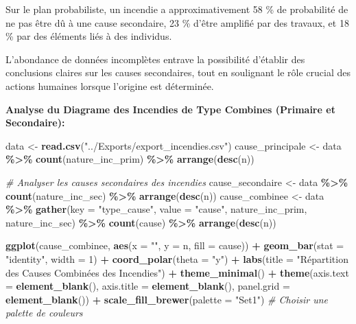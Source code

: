 \documentclass[
]{article}
\newenvironment{Shaded}{\begin{snugshade}}{\end{snugshade}}
\newcommand{\AttributeTok}[1]{\textcolor[rgb]{0.13,0.29,0.53}{#1}}
\newcommand{\CommentTok}[1]{\textcolor[rgb]{0.56,0.35,0.01}{\textit{#1}}}
\newcommand{\DecValTok}[1]{\textcolor[rgb]{0.00,0.00,0.81}{#1}}
\newcommand{\FunctionTok}[1]{\textcolor[rgb]{0.13,0.29,0.53}{\textbf{#1}}}
\newcommand{\NormalTok}[1]{#1}
\newcommand{\OtherTok}[1]{\textcolor[rgb]{0.56,0.35,0.01}{#1}}
\newcommand{\SpecialCharTok}[1]{\textcolor[rgb]{0.81,0.36,0.00}{\textbf{#1}}}
\newcommand{\StringTok}[1]{\textcolor[rgb]{0.31,0.60,0.02}{#1}}
\begin{document}
Sur le plan probabiliste, un incendie a approximativement 58 \% de
probabilité de ne pas être dû à une cause secondaire, 23 \% d'être
amplifié par des travaux, et 18 \% par des éléments liés à des
individus.

L'abondance de données incomplètes entrave la possibilité d'établir des
conclusions claires sur les causes secondaires, tout en soulignant le
rôle crucial des actions humaines lorsque l'origine est déterminée.

\textbf{Analyse du Diagrame des Incendies de Type Combines (Primaire et
Secondaire):}

\begin{Shaded}
\begin{Highlighting}[]
\NormalTok{data }\OtherTok{\textless{}{-}} \FunctionTok{read.csv}\NormalTok{(}\StringTok{"../Exports/export\_incendies.csv"}\NormalTok{)}
\NormalTok{cause\_principale }\OtherTok{\textless{}{-}}\NormalTok{ data }\SpecialCharTok{\%\textgreater{}\%}
  \FunctionTok{count}\NormalTok{(nature\_inc\_prim) }\SpecialCharTok{\%\textgreater{}\%}
  \FunctionTok{arrange}\NormalTok{(}\FunctionTok{desc}\NormalTok{(n))}

\CommentTok{\# Analyser les causes secondaires des incendies}
\NormalTok{cause\_secondaire }\OtherTok{\textless{}{-}}\NormalTok{ data }\SpecialCharTok{\%\textgreater{}\%}
  \FunctionTok{count}\NormalTok{(nature\_inc\_sec) }\SpecialCharTok{\%\textgreater{}\%}
  \FunctionTok{arrange}\NormalTok{(}\FunctionTok{desc}\NormalTok{(n))}
\NormalTok{cause\_combinee }\OtherTok{\textless{}{-}}\NormalTok{ data }\SpecialCharTok{\%\textgreater{}\%}
  \FunctionTok{gather}\NormalTok{(}\AttributeTok{key =} \StringTok{"type\_cause"}\NormalTok{, }\AttributeTok{value =} \StringTok{"cause"}\NormalTok{, nature\_inc\_prim, nature\_inc\_sec) }\SpecialCharTok{\%\textgreater{}\%}
  \FunctionTok{count}\NormalTok{(cause) }\SpecialCharTok{\%\textgreater{}\%}
  \FunctionTok{arrange}\NormalTok{(}\FunctionTok{desc}\NormalTok{(n))}

\FunctionTok{ggplot}\NormalTok{(cause\_combinee, }\FunctionTok{aes}\NormalTok{(}\AttributeTok{x =} \StringTok{""}\NormalTok{, }\AttributeTok{y =}\NormalTok{ n, }\AttributeTok{fill =}\NormalTok{ cause)) }\SpecialCharTok{+}
  \FunctionTok{geom\_bar}\NormalTok{(}\AttributeTok{stat =} \StringTok{"identity"}\NormalTok{, }\AttributeTok{width =} \DecValTok{1}\NormalTok{) }\SpecialCharTok{+}
  \FunctionTok{coord\_polar}\NormalTok{(}\AttributeTok{theta =} \StringTok{"y"}\NormalTok{) }\SpecialCharTok{+}
  \FunctionTok{labs}\NormalTok{(}\AttributeTok{title =} \StringTok{"Répartition des Causes Combinées des Incendies"}\NormalTok{) }\SpecialCharTok{+}
  \FunctionTok{theme\_minimal}\NormalTok{() }\SpecialCharTok{+}
  \FunctionTok{theme}\NormalTok{(}\AttributeTok{axis.text =} \FunctionTok{element\_blank}\NormalTok{(),}
        \AttributeTok{axis.title =} \FunctionTok{element\_blank}\NormalTok{(),}
        \AttributeTok{panel.grid =} \FunctionTok{element\_blank}\NormalTok{()) }\SpecialCharTok{+}
  \FunctionTok{scale\_fill\_brewer}\NormalTok{(}\AttributeTok{palette =} \StringTok{"Set1"}\NormalTok{) }\CommentTok{\# Choisir une palette de couleurs}
\end{Highlighting}
\end{Shaded}
\end{document}
